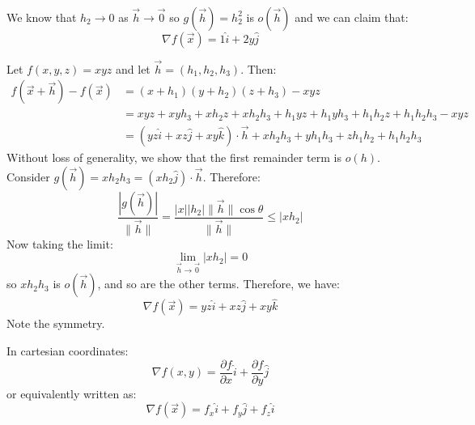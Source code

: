 \begin{itemize}
\begin{example}
\begin{align}
        \end{align}
        We know that $h_2 \to 0$ as $\vec{h}\to\vec{0}$ so $g(\vec{h})=h_2^2$ is $o(\vec{h})$ and we can claim that:
        \begin{equation}
            \nabla f(\vec{x}) = 1\hat{i}+2y\hat{j}
        \end{equation}
    \end{example}
    \begin{example}
        Let $f(x,y,z)=xyz$ and let $\vec{h}=(h_1,h_2,h_3)$. Then:
        \begin{align}
            f(\vec{x}+\vec{h})-f(\vec{x}) &= (x+h_1)(y+h_2)(z+h_3)-xyz \\ 
            &= xyz + xyh_3+xh_2z+xh_2h_3+h_1yz+h_1yh_3+h_1h_2z+h_1h_2h_3-xyz \\ 
            &= (yz \hat{i} + xz\hat{j} + xy\hat{k}) \cdot \vec{h} + xh_2h_3 + yh_1h_3+zh_1h_2+h_1h_2h_3
        \end{align}
        Without loss of generality, we show that the first remainder term is $o(h)$. Consider $g(\vec{h})=xh_2h_3 = (xh_2 \hat{j})\cdot \vec{h}$. Therefore:
        \begin{equation}
            \frac{|g(\vec{h})|}{\lVert \vec{h}\rVert} = \frac{|x||h_2|\lVert \vec{h}\rVert \cos\theta}{\lVert \vec{h}\rVert} \le |xh_2|
        \end{equation}
        Now taking the limit:
        \begin{equation}
            \lim_{\vec{h}\to \vec{0}}|xh_2| = 0
        \end{equation}
        so $xh_2h_3$ is $o(\vec{h})$, and so are the other terms. Therefore, we have:
        \begin{equation}
            \nabla f(\vec{x}) = yz\hat{i}+xz\hat{j}+xy\hat{k}
        \end{equation}
        Note the symmetry.
    \end{example}
    \begin{theorem}
        In cartesian coordinates:
        \begin{equation}
            \nabla f(x,y) = \frac{\partial f}{\partial x}\hat{i} + \frac{\partial f}{\partial y}\hat{j}
        \end{equation}
        or equivalently written as:
        \begin{equation}
            \nabla f(\vec{x})=f_x\hat{i} + f_y\hat{j}+f_z\hat{i}
        \end{equation}
    \end{theorem}

\end{itemize}
